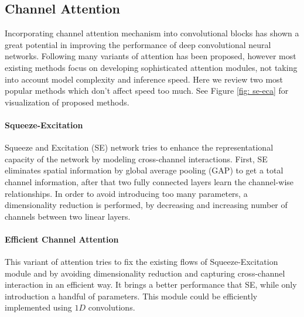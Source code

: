 \subsection{Channel Attention} \label{sec:channel-attn}
Incorporating channel attention mechanism \cite{hu2018_squeeze_SE} \cite{wang2020_eca} into convolutional blocks has shown a great potential in improving the performance of deep convolutional neural networks. %
Following \cite{hu2018_squeeze_SE} many variants of attention has been proposed, however most existing methods focus on developing sophisticated attention modules, not taking into account model complexity and inference speed. Here we review two most popular methods which don't affect speed too much. See Figure \ref{fig: se-eca} for visualization of proposed methods.

\paragraph{Squeeze-Excitation}
Squeeze and Excitation (SE) network tries to enhance the representational capacity of the network by modeling cross-channel interactions. First, SE eliminates spatial information by global average pooling (GAP) to get a total channel information, after that two fully connected layers learn the channel-wise relationships. In order to avoid introducing too many parameters, a dimensionality reduction is performed, by decreasing and increasing number of channels between two linear layers. 


\paragraph{Efficient Channel Attention} This variant of attention tries to fix the existing flows of Squeeze-Excitation module and by avoiding dimensionality reduction and capturing cross-channel interaction in an efficient way. It brings a better performance that SE, while only introduction a handful of parameters. This module could be efficiently implemented using $1 D $ convolutions. 

